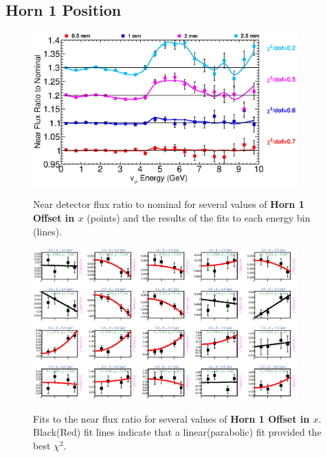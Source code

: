 \clearpage
\subsection{Horn 1 Position}

\begin{figure}[ht]
  \begin{center}
    {\includegraphics[width=4.0in]{figures/Horn1XOffset_near_summary.eps}}
  \end{center}
\caption{ Near detector flux ratio to nominal for several values of {\bf Horn 1 Offset in $x$} (points) and the results of the fits to each energy bin (lines).}
\end{figure}

\begin{figure}[hb]
  \begin{center}
    {\includegraphics[width=4.0in]{figures/Horn1XOffset_near_fits.eps}}
  \end{center}
\caption{ Fits to the near flux ratio for several values of {\bf Horn 1 Offset in $x$}. Black(Red) fit lines indicate that a linear(parabolic) fit provided the best $\chi^2$. }
\end{figure}

